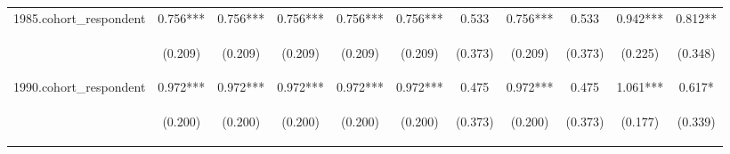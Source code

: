 \begin{center}
\begin{tabular}{lcccccccccc}
1985.cohort\_respondent & 0.756*** & 0.756*** & 0.756*** & 0.756*** & 0.756*** & 0.533 & 0.756*** & 0.533 & 0.942*** & 0.812** \\
\vspace{4pt} & \begin{footnotesize}(0.209)\end{footnotesize} & \begin{footnotesize}(0.209)\end{footnotesize} & \begin{footnotesize}(0.209)\end{footnotesize} & \begin{footnotesize}(0.209)\end{footnotesize} & \begin{footnotesize}(0.209)\end{footnotesize} & \begin{footnotesize}(0.373)\end{footnotesize} & \begin{footnotesize}(0.209)\end{footnotesize} & \begin{footnotesize}(0.373)\end{footnotesize} & \begin{footnotesize}(0.225)\end{footnotesize} & \begin{footnotesize}(0.348)\end{footnotesize} \\
1990.cohort\_respondent & 0.972*** & 0.972*** & 0.972*** & 0.972*** & 0.972*** & 0.475 & 0.972*** & 0.475 & 1.061*** & 0.617* \\
\vspace{4pt} & \begin{footnotesize}(0.200)\end{footnotesize} & \begin{footnotesize}(0.200)\end{footnotesize} & \begin{footnotesize}(0.200)\end{footnotesize} & \begin{footnotesize}(0.200)\end{footnotesize} & \begin{footnotesize}(0.200)\end{footnotesize} & \begin{footnotesize}(0.373)\end{footnotesize} & \begin{footnotesize}(0.200)\end{footnotesize} & \begin{footnotesize}(0.373)\end{footnotesize} & \begin{footnotesize}(0.177)\end{footnotesize} & \begin{footnotesize}(0.339)\end{footnotesize} \\

\end{tabular}
\end{center}
